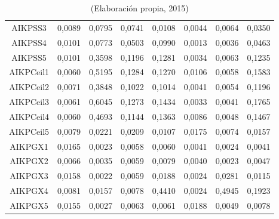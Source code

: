 \begin{table}[hbtp!]
\begin{center}
\begin{tabular}{cc|cccccc}
AIKPSS3 & 0,0089 & 0,0795 & 0,0741 & 0,0108 & 0,0044 & 0,0064 & 0,0350 \\
AIKPSS4 & 0,0101 & 0,0773 & 0,0503 & 0,0990 & 0,0013 & 0,0036 & 0,0463 \\
AIKPSS5 & 0,0101 & 0,3598 & 0,1196 & 0,1281 & 0,0034 & 0,0063 & 0,1235 \\ \hline
AIKPCeil1 & 0,0060 & 0,5195 & 0,1284 & 0,1270 & 0,0106 & 0,0058 & 0,1583 \\
AIKPCeil2 & 0,0071 & 0,3848 & 0,1022 & 0,1014 & 0,0041 & 0,0054 & 0,1196 \\
AIKPCeil3 & 0,0061 & 0,6045 & 0,1273 & 0,1434 & 0,0033 & 0,0041 & 0,1765 \\
AIKPCeil4 & 0,0060 & 0,4693 & 0,1144 & 0,1363 & 0,0086 & 0,0048 & 0,1467 \\
AIKPCeil5 & 0,0079 & 0,0221 & 0,0209 & 0,0107 & 0,0175 & 0,0074 & 0,0157 \\ \hline
AIKPGX1 & 0,0165 & 0,0023 & 0,0058 & 0,0060 & 0,0041 & 0,0024 & 0,0041 \\
AIKPGX2 & 0,0066 & 0,0035 & 0,0059 & 0,0079 & 0,0040 & 0,0023 & 0,0047 \\
AIKPGX3 & 0,0158 & 0,0022 & 0,0059 & 0,0188 & 0,0024 & 0,0281 & 0,0115 \\
AIKPGX4 & 0,0081 & 0,0157 & 0,0078 & 0,4410 & 0,0024 & 0,4945 & 0,1923 \\
AIKPGX5 & 0,0155 & 0,0027 & 0,0063 & 0,0061 & 0,0188 & 0,0049 & 0,0078 \\
\hline
\end{tabular}
\end{center}
\caption*{(Elaboración propia, 2015)}
\end{table}

